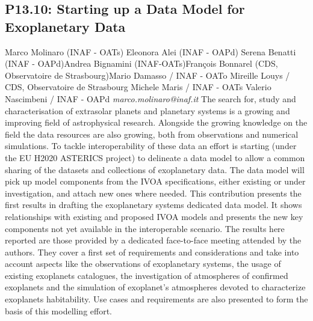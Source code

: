 \documentclass{report}
\begin{document}
\subsection*{P13.10: Starting up a Data Model for Exoplanetary Data}
\bigskip
Marco Molinaro (INAF - OATs) \newline Eleonora Alei (INAF - OAPd) \newline  Serena Benatti (INAF - OAPd)\newline  Andrea Bignamini (INAF-OATs)\newline François Bonnarel (CDS, Observatoire de Strasbourg)\newline  Mario Damasso / INAF - OATo
Mireille Louys / CDS, Observatoire de Strasbourg
Michele Maris / INAF - OATs
Valerio Nascimbeni / INAF - OAPd\newline\newline
{\it marco.molinaro@inaf.it}\newline
\newline\newline
The search for, study and characterisation of extrasolar planets and planetary systems is a growing and improving field of astrophysical research. Alongside the growing knowledge on the field the data resources are also growing, both from observations and numerical simulations.
To tackle interoperability of these data an effort is starting (under the EU H2020 ASTERICS project) to delineate a data model to allow a common sharing of the datasets and collections of exoplanetary data. The data model will pick up  model components from the IVOA specifications, either existing or under investigation, and attach new ones where needed.
This contribution presents the first results in drafting the exoplanetary systems dedicated data model. It shows relationships with existing and proposed IVOA models and presents the new key components not yet available in the interoperable scenario.
The results here reported are those provided by a dedicated face-to-face meeting attended by the authors. They cover a first set of requirements and considerations and take into account aspects like the observations of exoplanetary systems, the usage of existing exoplanets catalogues, the investigation of atmospheres of confirmed exoplanets and the simulation of exoplanet's atmospheres devoted to characterize exoplanets habitability.
Use cases and requirements are also presented to form the basis of this modelling effort.\newline
\newpage
\end{document}
